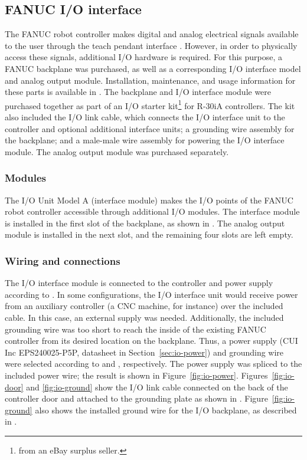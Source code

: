 \subsection{FANUC I/O interface}
The FANUC robot controller makes digital and analog electrical signals available to the user through the teach pendant interface \cite[sec~3.1.3]{lr-handling-tool}. However, in order to physically access these signals, additional I/O hardware is required. For this purpose, a FANUC backplane was purchased, as well as a corresponding I/O interface model and analog output module. Installation, maintenance, and usage information for these parts is available in \cite{io-unit}. The backplane and I/O interface module were purchased together as part of an I/O starter kit\footnote{from an eBay surplus seller.} for R-30iA controllers. The kit also included the I/O link cable, which connects the I/O interface unit to the controller and optional additional interface units; a grounding wire assembly for the backplane; and a male-male wire assembly for powering the I/O interface module. The analog output module was purchased separately. 

\subsubsection{Modules}
The I/O Unit Model A (interface module) makes the I/O points of the FANUC robot controller accessible through additional I/O modules. The interface module is installed in the first slot of the backplane, as shown in \cite[p~10]{io-unit}. The analog output module is installed in the next slot, and the remaining four slots are left empty.

\subsubsection{Wiring and connections}
The I/O interface module is connected to the controller and power supply according to \cite[ch~4]{io-unit}. In some configurations, the I/O interface unit would receive power from an auxiliary controller (a CNC machine, for instance) over the included cable. In this case, an external supply was needed. Additionally, the included grounding wire was too short to reach the inside of the existing FANUC controller from its desired location on the backplane. Thus, a power supply (CUI Inc EPS240025-P5P, datasheet in Section~\ref{sec:io-power}) and grounding wire were selected according to \cite[sec~4.2]{io-unit} and \cite[sec~4.3]{io-unit}, respectively. The power supply was spliced to the included power wire; the result is shown in Figure~\ref{fig:io-power}. Figures~\ref{fig:io-door} and \ref{fig:io-ground} show the I/O link cable connected on the back of the controller door and attached to the grounding plate as shown in \cite[Fig.3.2.2]{controller-maintenance}. Figure~\ref{fig:io-ground} also shows the installed ground wire for the I/O backplane, as described in \cite[sec~4.3]{io-unit}.


